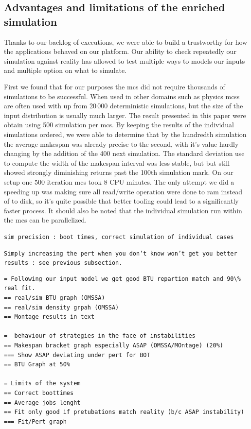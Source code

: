 \documentclass[10pt,conference,compsocconf]{IEEEtran}
\begin{document}
\subsection{Advantages and limitations of the enriched simulation}\label{sec:lim}

Thanks to our backlog of executions, we were able to build a trustworthy for how
the applications behaved on our platform. Our ability to check repeatedly our
simulation against reality has allowed to test multiple ways to models our
inputs and multiple option on what to simulate. 

First we found that for our purposes the \ac{mcs} did not require thousands of
simulations to be successful. When used in other domains such as physics
\acp{mcs} are often used with up from 20\,000 deterministic simulations, but the
size of the input distribution is usually much larger. The result presented in
this paper were obtain using 500 simulation per \ac{mcs}. By keeping the results
of the individual simulations ordered, we were able to determine that by the
hundredth simulation the average makespan was already precise to the second,
with it's value hardly changing by the addition of the 400 next simulation. The
standard deviation use to compute the width of the makespan interval was less
stable, but but still showed strongly diminishing returns past the 100th
simulation mark. On our setup one 500 iteration \ac{mcs} took 8 CPU minutes. The
only attempt we did a speeding up was making sure all read/write operation were
done to ram instead of to disk, so it's quite possible that better tooling could
lead to a significantly faster process. It should also be noted that the
individual simulation run within the \ac{mcs} can be parallelized.

\texttt{sim precision : boot times, correct simulation of individual cases}

\texttt{Simply increasing the pert when you don't know won't get you better
results : see previous subsection.}

\begin{verbatim}
= Following our input model we get good BTU repartion match and 90\% real fit.
== real/sim BTU graph (OMSSA)
== real/sim density grpah (OMSSA)
== Montage results in text

=  behaviour of strategies in the face of instabilities
== Makespan bracket graph especially ASAP (OMSSA/MOntage) (20%)
=== Show ASAP deviating under pert for BOT
== BTU Graph at 50%

= Limits of the system
== Correct boottimes
== Average jobs lenght
== Fit only good if pretubations match reality (b/c ASAP instability)
=== Fit/Pert graph

\end{verbatim}
\end{document}
